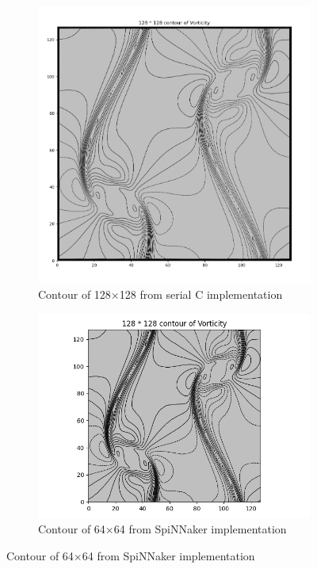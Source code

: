 \begin{figure}[htbp]
\medskip
\begin{subfigure}{0.43\textwidth}
\includegraphics[width=\linewidth]{figures/double_c_128.png}
\caption{Contour of 128$\times$128 from serial C implementation} \label{fig:c}
\end{subfigure}\hspace*{\fill}
\begin{subfigure}{0.57\textwidth}
\includegraphics[width=\linewidth]{figures/spinnaker_128.png}
\caption{Contour of 64$\times$64 from SpiNNaker implementation} \label{fig:d}
\end{subfigure}


\end{figure}
